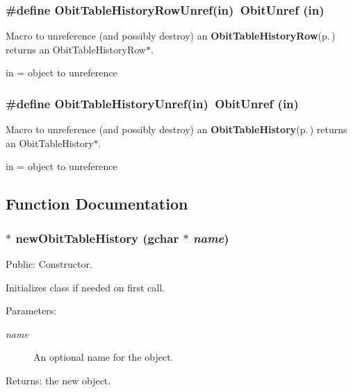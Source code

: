 \subsubsection{\setlength{\rightskip}{0pt plus 5cm}\#define Obit\-Table\-History\-Row\-Unref(in)\ Obit\-Unref (in)}\label{ObitTableHistory_8h_a4}


Macro to unreference (and possibly destroy) an {\bf Obit\-Table\-History\-Row}{\rm (p.\,\pageref{structObitTableHistoryRow})} returns an Obit\-Table\-History\-Row$\ast$. 

in = object to unreference 
\subsubsection{\setlength{\rightskip}{0pt plus 5cm}\#define Obit\-Table\-History\-Unref(in)\ Obit\-Unref (in)}\label{ObitTableHistory_8h_a1}


Macro to unreference (and possibly destroy) an {\bf Obit\-Table\-History}{\rm (p.\,\pageref{structObitTableHistory})} returns an Obit\-Table\-History$\ast$. 

in = object to unreference 

\subsection{Function Documentation}
\subsubsection{$\ast$ new\-Obit\-Table\-History (gchar $\ast$ {\em name})}\label{ObitTableHistory_8h_a11}


Public: Constructor. 

Initializes class if needed on first call. \begin{Desc}
\item[Parameters:]
\begin{description}
\item[{\em name}]An optional name for the object. \end{description}
\end{Desc}
\begin{Desc}
\item[Returns:]the new object. \end{Desc}
